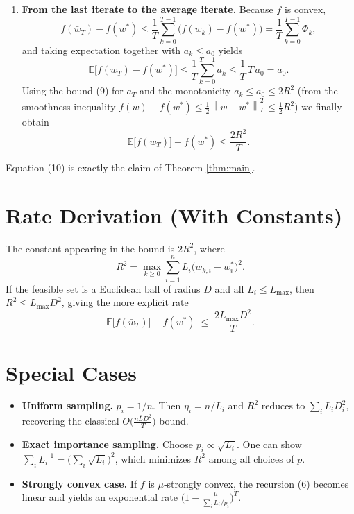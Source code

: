 \documentclass{article}
\newcommand{\E}{\mathbb{E}}
\newcommand{\norm}[1]{\left\lVert #1\right\rVert}
\begin{document}
\begin{enumerate}
\item[Step 7.] \textbf{From the last iterate to the average iterate.}
Because $f$ is convex,
\[
f(\bar w_T)-f(w^*)\le \frac{1}{T}\sum_{k=0}^{T-1}\bigl(f(w_k)-f(w^*)\bigr)
= \frac{1}{T}\sum_{k=0}^{T-1}\Phi_k,
\]
and taking expectation together with $a_k\le a_0$ yields
\[
\E\!\bigl[f(\bar w_T)-f(w^*)\bigr]\le
\frac{1}{T}\sum_{k=0}^{T-1}a_k
\le \frac{1}{T}\,T\,a_0 = a_0.
\]
Using the bound (9) for $a_T$ and the monotonicity $a_k\le a_0\le 2R^{2}$ (from
the smoothness inequality $f(w)-f(w^*)\le \tfrac12\norm{w-w^*}_{L}^{2}\le
\tfrac12R^{2}$) we finally obtain
\[
\E\!\bigl[f(\bar w_T)\bigr]-f(w^*)
\le \frac{2R^{2}}{T}.
\tag{10}
\]

\end{enumerate}
Equation (10) is exactly the claim of Theorem \ref{thm:main}.  \hfill\qedsymbol

\section*{Rate Derivation (With Constants)}
The constant appearing in the bound is $2R^{2}$, where
\[
R^{2}= \max_{k\ge0}\sum_{i=1}^{n}L_i\bigl(w_{k,i}-w^{*}_{i}\bigr)^{2}.
\]
If the feasible set is a Euclidean ball of radius $D$ and all $L_i\le L_{\max}$,
then $R^{2}\le L_{\max}D^{2}$, giving the more explicit rate
\[
\E\!\bigl[f(\bar w_T)\bigr]-f(w^*)\;\le\;\frac{2L_{\max}D^{2}}{T}.
\]

\section*{Special Cases}
\begin{itemize}
\item \textbf{Uniform sampling.} $p_i=1/n$.
Then $\eta_i=n/L_i$ and $R^{2}$ reduces to $\sum_i L_i D_i^{2}$,
recovering the classical $O\!\bigl(\frac{n\bar L D^{2}}{T}\bigr)$ bound.
\item \textbf{Exact importance sampling.} Choose $p_i\propto\sqrt{L_i}$.
One can show $\sum_i L_i^{-1}= \bigl(\sum_i\sqrt{L_i}\bigr)^{2}$,
which minimizes $R^{2}$ among all choices of $p$.
\item \textbf{Strongly convex case.}
If $f$ is $\mu$‑strongly convex, the recursion (6) becomes linear and yields an
exponential rate $\bigl(1-\frac{\mu}{\sum_i L_i/p_i}\bigr)^{T}$.
\end{itemize}
\end{document}
